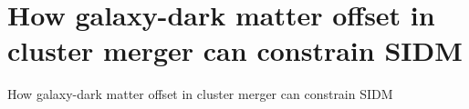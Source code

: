 \documentclass[ucdthesis.tex]{subfiles}
\begin{document}
    
    \doublespacing
		\setcounter{chapter}{1}
		\chapter{How galaxy-dark matter offset in cluster merger can constrain
		SIDM}{How galaxy-dark matter offset in cluster merger can constrain SIDM}{}
		\label{chapter2}

						 

        
\end{document}
